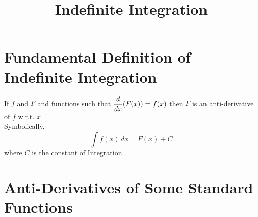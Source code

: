 \documentclass{article}
\title{Indefinite Integration}
\author{}
\date{}
\begin{document}
\maketitle

\section{Fundamental Definition of \\ Indefinite Integration}
If $f$ and $F$ and functions such that $\displaystyle\dv{x}(F(x))=f(x)$ then $F$ is an anti-derivative of $f$ w.r.t. $x$
\\
Symbolically, $$\displaystyle\int f(x) \,dx=F(x)+C$$
where $C$ is the constant of Integration

\section{Anti-Derivatives of Some Standard Functions}
\end{document}
